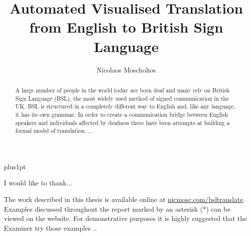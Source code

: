 \documentclass[12pt]{ociamthesis}  %
\title{Automated Visualised Translation from English to British Sign Language}
\author{Nicolaos Moscholios}             %
\begin{document}
\baselineskip=18pt plus1pt

\maketitle                  %

\begin{abstract}
A large number of people in the world today are born deaf and many rely on British Sign Language (BSL), the most widely used method of signed communication in the UK. BSL is structured in a completely different way to English and, like any language, it has its own grammar. In order to create a communication bridge between English speakers and individuals affected by deafness there have been attempts at building a formal model of translation. ...
\end{abstract}

\begin{acknowledgements}
I would like to thank...
\end{acknowledgements}

\begin{notes}
The work described in this thesis is available online at \url{nicmosc.com/bsltranslate}. Examples discussed throughout the report marked by an asterisk ($\ast$) can be viewed on the website. For demonstrative purposes it is highly suggested that the Examiner try those examples ..
\end{notes}

{\pagestyle{plain}
	\begin{romanpages}          %
	\setcounter{tocdepth}{5}
	\setcounter{secnumdepth}{5}
	\tableofcontents            %
	\listoffigures              %
	\listoftables
	\end{romanpages}            %
\cleardoublepage}

\end{document}
